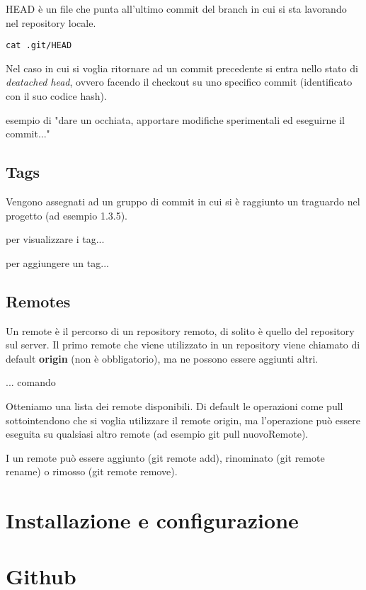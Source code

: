 \documentclass{article} \usepackage[textwidth=18cm,textheight=18cm]{geometry}
\begin{document}
HEAD è un file che punta all'ultimo commit del branch in cui si sta lavorando
nel repository locale.

\begin{verbatim}
cat .git/HEAD
\end{verbatim}

Nel caso in cui si voglia ritornare ad un commit precedente si entra nello stato
di \emph{deatached head}, ovvero facendo il checkout su uno specifico commit
(identificato con il suo codice hash).

esempio di "dare un occhiata, apportare modifiche sperimentali ed eseguirne il
commit..."

\subsection{Tags}

Vengono assegnati ad un gruppo di commit in cui si è raggiunto un traguardo nel
progetto (ad esempio 1.3.5).

per visualizzare i tag...

per aggiungere un tag...

\subsection{Remotes}

Un remote è il percorso di un repository remoto, di solito è quello del
repository sul server. Il primo remote che viene utilizzato in un repository
viene chiamato di default \textbf{origin} (non è obbligatorio), ma ne possono
essere aggiunti altri.

... comando

Otteniamo una lista dei remote disponibili. Di default le operazioni come pull
sottointendono che si voglia utilizzare il remote origin, ma l'operazione può
essere eseguita su qualsiasi altro remote (ad esempio git pull nuovoRemote).

I un remote può essere aggiunto (git remote add), rinominato (git remote rename)
o rimosso (git remote remove).

\section{Installazione e configurazione}

\section{Github}
\end{document}
